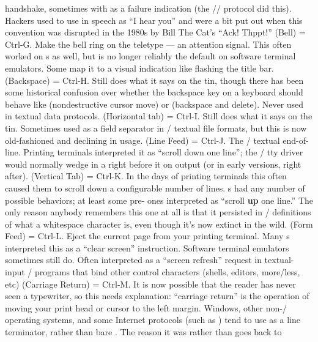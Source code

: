 handshake, sometimes with  as a failure indication (the //
protocol did this). Hackers used to use  in speech as ``I hear you'' and
were a bit put out when this convention was disrupted in the 1980s by Bill The
Cat's ``Ack! Thppt!''
\dlist {} (Bell) = Ctrl-G.
Make the bell ring on the teletype --- an attention signal. This often worked on
s as well, but is no longer reliably the default on software terminal
emulators. Some map it to a visual indication like flashing the title bar.
\dlist {} (Backspace) = Ctrl-H.
Still does what it says on the tin, though there has been some historical
confusion over whether the backspace key on a keyboard should behave like 
(nondestructive cursor move) or  (backspace and delete). Never used in
textual data protocols.
\dlist {} (Horizontal tab) = Ctrl-I.
Still does what it says on the tin. Sometimes used as a field separator in \UNIX/
textual file formats, but this is now old-fashioned and declining in usage.
\dlist {} (Line Feed) = Ctrl-J.
The \UNIX/ textual end-of-line. Printing terminals interpreted it as ``scroll down
one line''; the \UNIX/ tty driver would normally wedge in a  right before it on
output (or in early versions, right after).
\dlist {} (Vertical Tab) = Ctrl-K.
In the days of printing terminals this often caused them to scroll down a
configurable number of lines. s had any number of possible behaviors; at
least some pre- ones interpreted  as ``scroll {\bf up} one line.'' The only
reason anybody remembers this one at all is that it persisted in \UNIX/
definitions of what a whitespace character is, even though it's now extinct in
the wild.
\dlist {} (Form Feed) = Ctrl-L. Eject the current page from your printing
terminal. Many s interpreted this as a ``clear screen'' instruction. Software
terminal emulators sometimes still do. Often interpreted as a ``screen refresh''
request in textual-input \UNIX/ programs that bind other control characters
(shells, editors, more/less, etc)
\dlist {} (Carriage Return) = Ctrl-M.
It is now possible that the reader has never seen a typewriter, so this needs
explanation: ``carriage return'' is the operation of moving your print head or
cursor to the left margin. Windows, other non-\UNIX/ operating systems, and some
Internet protocols (such as ) tend to use  as a line terminator,
rather than bare . The reason it was  rather than  goes back to

